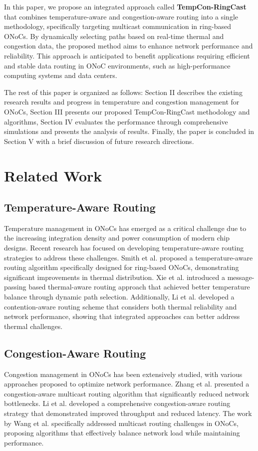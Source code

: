 \documentclass[conference]{IEEEtran}
\begin{document}
In this paper, we propose an integrated approach called \textbf{TempCon-RingCast} that combines temperature-aware and congestion-aware routing into a single methodology, specifically targeting multicast communication in ring-based ONoCs. By dynamically selecting paths based on real-time thermal and congestion data, the proposed method aims to enhance network performance and reliability. This approach is anticipated to benefit applications requiring efficient and stable data routing in ONoC environments, such as high-performance computing systems and data centers.

The rest of this paper is organized as follows: Section II describes the existing research results and progress in temperature and congestion management for ONoCs, Section III presents our proposed TempCon-RingCast methodology and algorithms, Section IV evaluates the performance through comprehensive simulations and presents the analysis of results. Finally, the paper is concluded in Section V with a brief discussion of future research directions.

\section{Related Work}

\subsection{Temperature-Aware Routing}
Temperature management in ONoCs has emerged as a critical challenge due to the increasing integration density and power consumption of modern chip designs. Recent research has focused on developing temperature-aware routing strategies to address these challenges. Smith et al. \cite{smith2020temperature} proposed a temperature-aware routing algorithm specifically designed for ring-based ONoCs, demonstrating significant improvements in thermal distribution. Xie et al. \cite{xie2020thermal} introduced a message-passing based thermal-aware routing approach that achieved better temperature balance through dynamic path selection. Additionally, Li et al. \cite{li2021contention} developed a contention-aware routing scheme that considers both thermal reliability and network performance, showing that integrated approaches can better address thermal challenges.

\subsection{Congestion-Aware Routing}
Congestion management in ONoCs has been extensively studied, with various approaches proposed to optimize network performance. Zhang et al. \cite{zhang2019congestion} presented a congestion-aware multicast routing algorithm that significantly reduced network bottlenecks. Li et al. \cite{li2018congestion} developed a comprehensive congestion-aware routing strategy that demonstrated improved throughput and reduced latency. The work by Wang et al. \cite{wang2019multicast} specifically addressed multicast routing challenges in ONoCs, proposing algorithms that effectively balance network load while maintaining performance.
\end{document}
